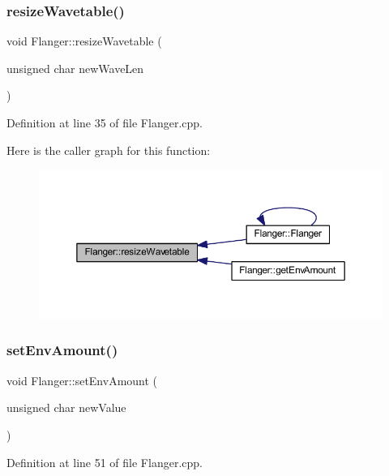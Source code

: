 \subsubsection{\texorpdfstring{resize\+Wavetable()}{resizeWavetable()}}
{\footnotesize\ttfamily void Flanger\+::resize\+Wavetable (\begin{DoxyParamCaption}\item[{unsigned char}]{new\+Wave\+Len }\end{DoxyParamCaption})}



Definition at line 35 of file Flanger.\+cpp.

Here is the caller graph for this function\+:
\nopagebreak
\begin{figure}[H]
\begin{center}
\leavevmode
\includegraphics[width=350pt]{class_flanger_a382a9889299da650998fe547dd859c5f_icgraph}
\end{center}
\end{figure}
\mbox{\label{class_flanger_ac4f38ebccacae85c724fe43f13caf636}} 
\subsubsection{\texorpdfstring{set\+Env\+Amount()}{setEnvAmount()}}
{\footnotesize\ttfamily void Flanger\+::set\+Env\+Amount (\begin{DoxyParamCaption}\item[{unsigned char}]{new\+Value }\end{DoxyParamCaption})}



Definition at line 51 of file Flanger.\+cpp.

